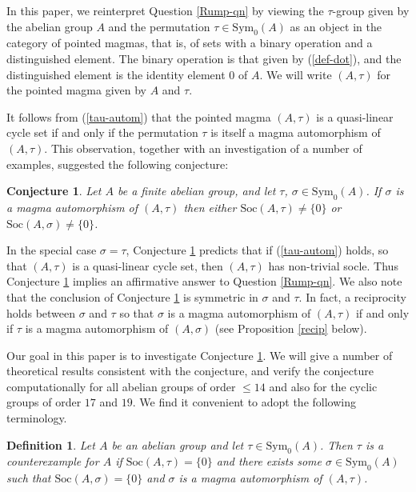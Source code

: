 \documentclass[letterpaper,12pt]{amsart}
\numberwithin{equation}{section}
\numberwithin{algorithm}{section}
\newtheorem{definition}[lemma]{Definition}
\newtheorem{conjecture}[lemma]{Conjecture}
\theoremstyle{definition}
\newcommand{\Soc}{\mathrm{Soc}}
\newcommand{\Symo}{\mathrm{Sym}_0}
\begin{document}
In this paper, we reinterpret Question \ref{Rump-qn} by viewing the $\tau$-group given by the abelian group $A$ and the permutation $\tau \in \Symo(A)$ as an object in the category of pointed magmas, that is, of sets with a binary operation and a distinguished element. The binary operation is that given by (\ref{def-dot}), and the distinguished element is the identity element $0$ of $A$. We will write $(A,\tau)$ for the pointed magma given by $A$ and $\tau$. 

It follows from (\ref{tau-autom}) that the pointed magma $(A,\tau)$ is a quasi-linear cycle set if and only if the permutation $\tau$ is itself a magma automorphism of $(A,\tau)$. This observation, together with an investigation of a number of examples, suggested the following conjecture:

\begin{conjecture}  \label{main-conj}
Let $A$ be a finite abelian group, and let $\tau$, $\sigma \in \Symo(A)$. If $\sigma$ is a magma automorphism of $(A,\tau)$ then either $\Soc(A,\tau)\neq \{0\}$ or $\Soc(A,\sigma)\neq \{0\}$.
\end{conjecture}

In the special case $\sigma=\tau$, Conjecture \ref{main-conj} predicts that if (\ref{tau-autom}) holds, so that $(A,\tau)$ is a quasi-linear cycle set, then $(A,\tau)$ has non-trivial socle. Thus Conjecture \ref{main-conj} implies an affirmative answer to Question \ref{Rump-qn}. We also note that the conclusion of Conjecture \ref{main-conj} is symmetric in $\sigma$ and $\tau$. In fact, a reciprocity holds between $\sigma$ and $\tau$ so that $\sigma$ is a magma automorphism of $(A,\tau)$ if and only if $\tau$ is a magma automorphism of $(A,\sigma)$ (see Proposition \ref{recip} below).

Our goal in this paper is to investigate Conjecture \ref{main-conj}. We will give a number of theoretical results consistent with the conjecture, and verify the conjecture computationally for all abelian groups of order $\leq 14$ and also for the cyclic groups of order $17$ and $19$. We find it convenient to adopt the following terminology.

\begin{definition}  \label{def-c-ex}
Let $A$ be an abelian group and let $\tau \in \Symo(A)$. Then $\tau$ is a {\em counterexample for} $A$ if $\Soc(A,\tau)=\{0\}$ and there exists some $\sigma \in \Symo(A)$ such that  $\Soc(A,\sigma)=\{0\}$ and $\sigma$ is a magma automorphism of $(A,\tau)$.
\end{definition}
\end{document}
